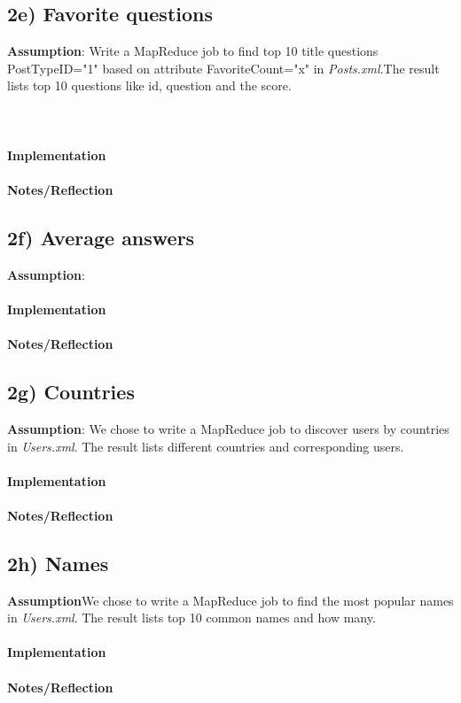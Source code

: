 \documentclass[fleqn,10pt]{wlscirep}
\begin{document}
\subsection*{2e) Favorite questions }
\textbf{Assumption}: Write a MapReduce job to find top 10 title questions PostTypeID="1"  based on attribute FavoriteCount="x" in \textit{Posts.xml}.The result lists top 10 questions like id, question and the score.\\ \\ \\ \\
\textbf{Implementation}  \\ \\
\textbf{Notes/Reflection}
%

\subsection*{2f) Average answers}
\textbf{Assumption}: \\ \\
\textbf{Implementation}  \\ \\
\textbf{Notes/Reflection}


\subsection*{2g) Countries }
\textbf{Assumption}: We chose to write a MapReduce job to discover users by countries in \textit{Users.xml}. The result lists different countries and corresponding users. \\ \\
\textbf{Implementation}  \\ \\
\textbf{Notes/Reflection}
%

\subsection*{2h) Names}
\textbf{Assumption}We chose to write a MapReduce job to find the most popular names in \textit{Users.xml}. The result lists top 10 common names and how many.  \\ \\
\textbf{Implementation}  \\ \\
\textbf{Notes/Reflection}
%
\end{document}
